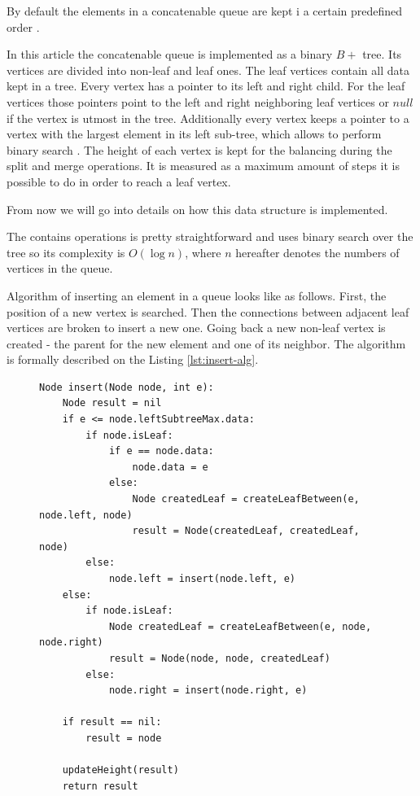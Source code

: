 \documentclass[a4paper,UKenglish,cleveref, autoref]{socg-lipics-v2019}
\begin{document}
	By default the elements in a concatenable queue are kept i a certain predefined order \cite[pp..~155-157]{aho}.
	
	In this article the concatenable queue is implemented as a binary  $B+$ tree. Its vertices are divided into non-leaf and leaf ones. The leaf vertices contain all data kept in a tree. Every vertex has a pointer to its left and right child. For the leaf vertices those pointers point to the left and right neighboring leaf vertices or $null$ if the vertex is utmost in the tree. 
	Additionally every vertex keeps a pointer to a vertex with the largest element in its left sub-tree, which  allows to perform binary search \cite[pp..~155-157]{aho}. The height of each vertex is kept for the balancing during the split and merge operations. It is measured as a maximum amount of steps it is possible to do in order to reach a leaf vertex.
	
	From now we will go into details on how this data structure is implemented. 
	
	The contains operations is pretty straightforward and uses binary search over the tree so its complexity is $O(\log n)$, where $n$ hereafter denotes the numbers of vertices in the queue.
	
	Algorithm of inserting an element in a queue looks like as follows. First, the position of a new vertex is searched. Then the connections between adjacent leaf vertices are broken to insert a new one. Going back a new non-leaf vertex is created - the parent for the new element and one of its neighbor. The algorithm is formally described on the Listing \ref{lst:insert-alg}.
	
	\begin{figure}[htbp]
		\begin{lstlisting}[caption={Queue insertion algorithm},label={lst:insert-alg},captionpos=b]
Node insert(Node node, int e):
    Node result = nil
    if e <= node.leftSubtreeMax.data:
        if node.isLeaf:
            if e == node.data:
                node.data = e
            else:
                Node createdLeaf = createLeafBetween(e, node.left, node)
                result = Node(createdLeaf, createdLeaf, node)
        else:
            node.left = insert(node.left, e)
    else:
        if node.isLeaf:
            Node createdLeaf = createLeafBetween(e, node, node.right)
            result = Node(node, node, createdLeaf)
        else:
            node.right = insert(node.right, e)

    if result == nil:
        result = node

    updateHeight(result)
    return result

		\end{lstlisting}
	\end{figure}
	
\end{document}
